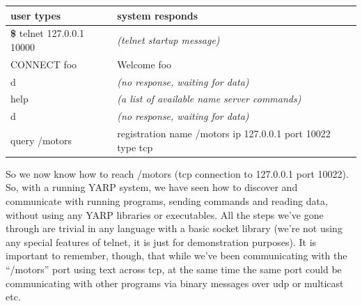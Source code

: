 \begin{center}
\begin{tabular}{lp{8cm}}
\hline\hline
{\bf user types} & {\bf system responds} \\
\hline
{\bf \$} telnet 127.0.0.1 10000 & {\it (telnet startup message)} \\
CONNECT foo & Welcome foo \\
 d & {\it (no response, waiting for data)} \\
 help & {\it (a list of available name server commands)} \\
 d & {\it (no response, waiting for data)} \\
 {query /motors} &  registration name /motors ip 127.0.0.1 port 10022 type tcp \\
\hline\hline
\end{tabular}
\end{center}


So we now know how to reach /motors (tcp connection to 127.0.0.1 port 10022).
%
So, with a running YARP system, we have seen how to discover
and communicate with running programs, sending commands and reading
data, without using any YARP libraries or executables.  All the steps
we've gone through are trivial in any language with a basic socket
library (we're not using any special features of telnet, it is just
for demonstration purposes).  It is important to remember, though,
that while we've been communicating with the ``/motors'' port using
text across tcp, at the same time the same port could be communicating
with other programs via binary messages over udp or multicast etc.



